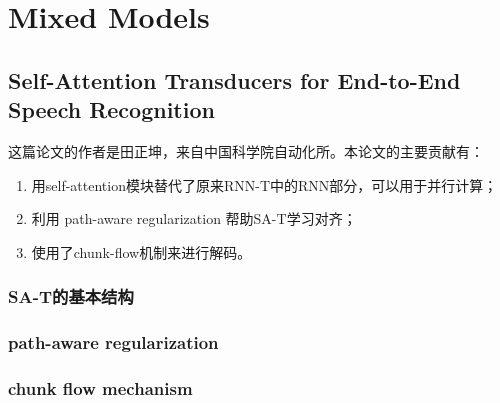\section{Mixed Models}

\subsection{Self-Attention Transducers for End-to-End Speech Recognition}
这篇论文的作者是田正坤，来自中国科学院自动化所。本论文的主要贡献有：
\begin{enumerate}
  \item 用self-attention模块替代了原来RNN-T中的RNN部分，可以用于并行计算；
  \item 利用 path-aware regularization 帮助SA-T学习对齐；
  \item 使用了chunk-flow机制来进行解码。
\end{enumerate}

\subsubsection{SA-T的基本结构}

\subsubsection{path-aware regularization}

\subsubsection{chunk flow mechanism}

